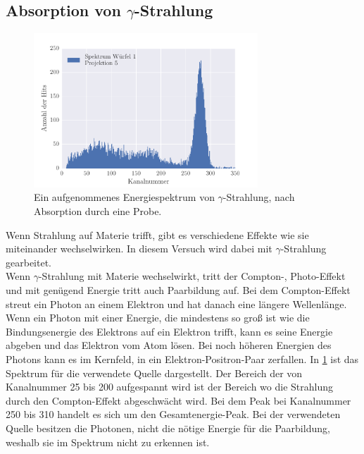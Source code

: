 \subsection{Absorption von $\gamma$-Strahlung}
\begin{figure}[h!]
	\centering
	\includegraphics[width = 0.75\textwidth]{../Grafiken/Spektrum_Block_1_Messung_5_0_350_histogram.pdf}
	\caption{Ein aufgenommenes Energiespektrum von $\gamma$-Strahlung, nach Absorption durch eine Probe.}\label{fig:EnergieSpektrum}
\end{figure}
Wenn Strahlung auf Materie trifft, gibt es verschiedene Effekte wie sie miteinander wechselwirken. 
In diesem Versuch wird dabei mit $\gamma$-Strahlung gearbeitet.\\
Wenn $\gamma$-Strahlung mit Materie wechselwirkt, tritt der Compton-, Photo-Effekt und mit genügend Energie tritt auch Paarbildung auf.
Bei dem Compton-Effekt streut ein Photon an einem Elektron und hat danach eine längere Wellenlänge.
Wenn ein Photon mit einer Energie, die mindestens so groß ist wie die Bindungsenergie des Elektrons auf ein Elektron trifft, kann es seine Energie abgeben und das Elektron vom Atom lösen.
Bei noch höheren Energien des Photons kann es im Kernfeld, in ein Elektron-Positron-Paar zerfallen.
In \cref{fig:EnergieSpektrum} ist das Spektrum für die verwendete Quelle dargestellt.
Der Bereich der von Kanalnummer 25 bis 200 aufgespannt wird ist der Bereich wo die Strahlung durch den Compton-Effekt abgeschwächt wird.
Bei dem Peak bei Kanalnummer 250 bis 310 handelt es sich um den Gesamtenergie-Peak.
Bei der verwendeten Quelle besitzen die Photonen, nicht die nötige Energie für die Paarbildung, weshalb sie im Spektrum nicht zu erkennen ist.


